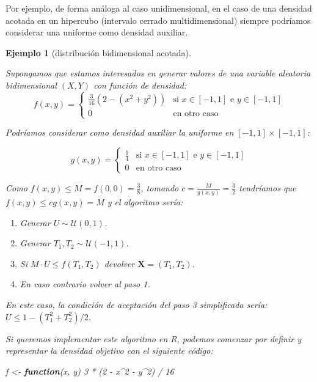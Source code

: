 \documentclass[
  10pt,
]{book}
\newenvironment{Shaded}{\begin{snugshade}}{\end{snugshade}}
\newcommand{\ControlFlowTok}[1]{\textcolor[rgb]{0.13,0.29,0.53}{\textbf{#1}}}
\newcommand{\DecValTok}[1]{\textcolor[rgb]{0.00,0.00,0.81}{#1}}
\newcommand{\NormalTok}[1]{#1}
\newcommand{\OtherTok}[1]{\textcolor[rgb]{0.56,0.35,0.01}{#1}}
\newcommand{\SpecialCharTok}[1]{\textcolor[rgb]{0.00,0.00,0.00}{#1}}
\renewcommand{\mathbf}[1]{\symbf{#1}}
\theoremstyle{break}
\newtheorem{example}{Ejemplo}[chapter]
\theoremstyle{nonumberplain}
\begin{document}
Por ejemplo, de forma análoga al caso unidimensional, en el caso de una densidad acotada en un hipercubo (intervalo cerrado multidimensional) siempre podríamos considerar una uniforme como densidad auxiliar.

\begin{example}[distribución bidimensional acotada]
\protect\hypertarget{exm:ar-bidim}{}\label{exm:ar-bidim}

Supongamos que estamos interesados en generar valores de una variable aleatoria bidimensional
\(\left( X,Y\right)\) con función de densidad:
\[f(x,y)= \left\{ 
\begin{array}{cl}
\frac{3}{16}\left( 2-\left( x^2+y^2\right) \right)  & \text{si }x\in
[-1, 1]\text{ e }y \in [-1, 1] \\ 
0 & \text{en otro caso}
\end{array}
\right.\]

Podríamos considerar como densidad auxiliar la uniforme en \([-1, 1] \times [-1, 1]\):

\[g\left( x, y \right) = \left\{
\begin{array}{ll}
\frac{1}{4} & \text{si }x \in [-1, 1] \text{ e }y\in [-1, 1] \\
0 &  \text{en otro caso}
\end{array}\right.\]

Como \(f(x, y) \leq M = f(0,0) = \frac38\), tomando \(c= \frac{M}{g(x,y)} = \frac32\)
tendríamos que \(f(x,y) \leq cg(x,y) = M\) y el algoritmo sería:

\begin{enumerate}
\def\labelenumi{\arabic{enumi}.}
\item
  Generar \(U \sim \mathcal{U}\left( 0, 1\right)\).
\item
  Generar \(T_1, T_2 \sim \mathcal{U}\left( -1, 1 \right)\).
\item
  Si \(M \cdot U\leq f(T_1, T_2)\)
  devolver \(\mathbf{X} = (T_1, T_2)\).
\item
  En caso contrario volver al paso 1.
\end{enumerate}

En este caso, la condición de aceptación del paso 3 simplificada sería:
\(U \leq 1 - \left( T_1^2 + T_2^2 \right) / 2\).

Si queremos implementar este algoritmo en R, podemos comenzar por
definir y representar la densidad objetivo con el siguiente código:

\begin{Shaded}
\begin{Highlighting}[]
\NormalTok{f }\OtherTok{\textless{}{-}} \ControlFlowTok{function}\NormalTok{(x, y) }\DecValTok{3} \SpecialCharTok{*}\NormalTok{ (}\DecValTok{2} \SpecialCharTok{{-}}\NormalTok{ x}\SpecialCharTok{\^{}}\DecValTok{2} \SpecialCharTok{{-}}\NormalTok{ y}\SpecialCharTok{\^{}}\DecValTok{2}\NormalTok{) }\SpecialCharTok{/} \DecValTok{16}


\end{Highlighting}
\end{Shaded}
\end{example}
\end{document}
